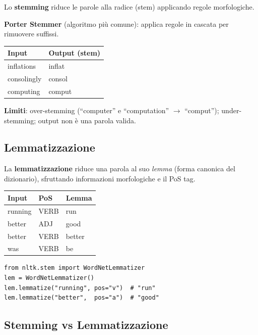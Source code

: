 \documentclass[12pt,a4paper]{article}
\begin{document}
Lo \textbf{stemming} riduce le parole alla radice (stem) applicando regole morfologiche.

\textbf{Porter Stemmer} (algoritmo più comune): applica regole in cascata per rimuovere suffissi.

\begin{center}
\begin{tabular}{ll}
\toprule
Input & Output (stem) \\
\midrule
inflations & inflat \\
consolingly & consol \\
computing & comput \\
\bottomrule
\end{tabular}
\end{center}

\textbf{Limiti}: over-stemming (``computer'' e ``computation'' $\to$ ``comput''); under-stemming; output non è una parola valida.

\subsection{Lemmatizzazione}

La \textbf{lemmatizzazione} riduce una parola al suo \emph{lemma} (forma canonica del dizionario), sfruttando informazioni morfologiche e il PoS tag.

\begin{center}
\begin{tabular}{lll}
\toprule
Input & PoS & Lemma \\
\midrule
running & VERB & run \\
better & ADJ & good \\
better & VERB & better \\
was & VERB & be \\
\bottomrule
\end{tabular}
\end{center}

\begin{lstlisting}
from nltk.stem import WordNetLemmatizer
lem = WordNetLemmatizer()
lem.lemmatize("running", pos="v")  # "run"
lem.lemmatize("better",  pos="a")  # "good"
\end{lstlisting}

\subsection{Stemming vs Lemmatizzazione}
\end{document}
